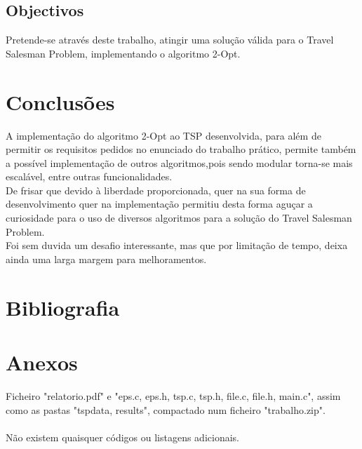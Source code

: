 \documentclass[12pt,a4paper,portrait]{article}
\begin{document}
		\subsection{Objectivos}
			Pretende-se através deste trabalho, atingir uma solução válida para o Travel Salesman Problem, implementando o algoritmo 2-Opt.\\
	\section{Conclusões}
		A implementação do algoritmo 2-Opt ao TSP desenvolvida, para além de permitir os requisitos pedidos no enunciado do trabalho prático, permite também a possível implementação de outros algoritmos,pois sendo modular torna-se mais escalável, entre outras funcionalidades.\\
		De frisar que devido à liberdade proporcionada, quer na sua forma de desenvolvimento quer na implementação permitiu desta forma aguçar a curiosidade para o uso de diversos algoritmos para a solução do Travel Salesman Problem.\\
		Foi sem duvida um desafio interessante, mas que por limitação de tempo, deixa ainda uma larga margem para melhoramentos.\\
	\newpage
	\section{Bibliografia}
	
	

	\newpage
	\section{Anexos}
		Ficheiro "relatorio.pdf" e "eps.c, eps.h, tsp.c, tsp.h, file.c, file.h, main.c", assim como as pastas "tspdata, results", compactado num ficheiro "trabalho.zip".\\\\
		Não existem quaisquer códigos ou listagens adicionais.\\					
\end{document}
